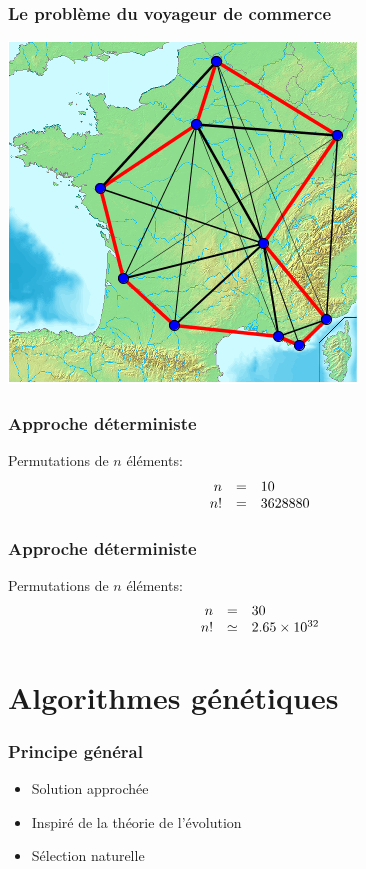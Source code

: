 \documentclass[16pt]{beamer}
\begin{document}
\begin{frame}
  \frametitle{Le problème du voyageur de commerce}
  \begin{center}
    \includegraphics[scale=0.7]{Carte_france_10_villes.png}
  \end{center}
\end{frame}

\begin{frame}
  \frametitle{Approche déterministe}
  Permutations de $n$ éléments:
  \[
  \begin{array}{r c l}
  n &=& 10 \\
  n! &=& 3 628 880
  \end{array}
  \]
\end{frame}

\begin{frame}
  \frametitle{Approche déterministe}
  Permutations de $n$ éléments:
  \[
  \begin{array}{r c l}
  n &=& 30 \\
  n! &\simeq& 2.65 \times 10^{32}
  \end{array}
  \]
\end{frame}

\section{Algorithmes génétiques}

\begin{frame}
  \frametitle{Principe général}
  \begin{itemize}
    \item Solution approchée
    \item Inspiré de la théorie de l'évolution
    \item Sélection naturelle
  \end{itemize}
\end{frame}
\end{document}
